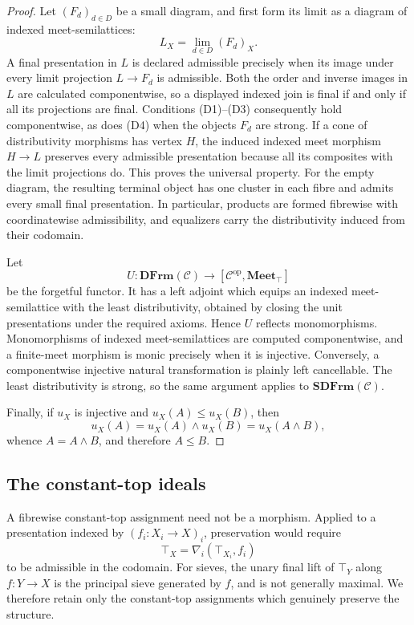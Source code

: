 \documentclass[12pt,oneside,reqno]{amsart}
\theoremstyle{definition}
\theoremstyle{remark}
\newcommand{\C}{\mathcal C}
\newcommand{\DFrm}{\mathbf{DFrm}}
\newcommand{\SDFrm}{\mathbf{SDFrm}}
\newcommand{\Meet}{\mathbf{Meet}_{\top}}
\begin{document}
\begin{proof}
Let \((F_d)_{d\in D}\) be a small diagram, and first form its limit as
a diagram of indexed meet-semilattices:
\[
                         L_X=\lim_{d\in D}(F_d)_X.
\]
A final presentation in \(L\) is declared admissible precisely when
its image under every limit projection \(L\to F_d\) is admissible.
Both the order and inverse images in \(L\) are calculated
componentwise, so a displayed indexed join is final if and only if all
its projections are final.  Conditions \textup{(D1)--(D3)} consequently
hold componentwise, as does \textup{(D4)} when the objects \(F_d\) are
strong.  If a cone of distributivity morphisms has vertex \(H\), the
induced indexed meet morphism \(H\to L\) preserves every admissible
presentation because all its composites with the limit projections do.
This proves the universal property.  For the empty diagram, the
resulting terminal object has one cluster in each fibre and admits every
small final presentation.  In particular, products are formed
fibrewise with coordinatewise admissibility, and equalizers carry the
distributivity induced from their codomain.

Let
\[
 U:\DFrm(\C)\longrightarrow[\C^{\mathrm{op}},\Meet]
\]
be the forgetful functor.  It has a left adjoint which equips an indexed
meet-semilattice with the least distributivity, obtained by closing the
unit presentations under the required axioms.  Hence \(U\) reflects
monomorphisms.  Monomorphisms of indexed meet-semilattices are computed
componentwise, and a finite-meet morphism is monic precisely when it is
injective.  Conversely, a componentwise injective natural
transformation is plainly left cancellable.  The least distributivity
is strong, so the same argument applies to \(\SDFrm(\C)\).

Finally, if \(u_X\) is injective and \(u_X(A)\leqslant u_X(B)\), then
\[
 u_X(A)=u_X(A)\wedge u_X(B)=u_X(A\wedge B),
\]
whence \(A=A\wedge B\), and therefore \(A\leqslant B\).
\end{proof}

\subsection{The constant-top ideals}

A fibrewise constant-top assignment need not be a morphism.  Applied to
a presentation indexed by \((f_i:X_i\to X)_i\), preservation would
require
\[
                    \top_X=\nabla_i(\top_{X_i},f_i)
\]
to be admissible in the codomain.  For sieves, the unary final lift of
\(\top_Y\) along \(f:Y\to X\) is the principal sieve generated by
\(f\), and is not generally maximal.  We therefore retain only the
constant-top assignments which genuinely preserve the structure.
\end{document}
